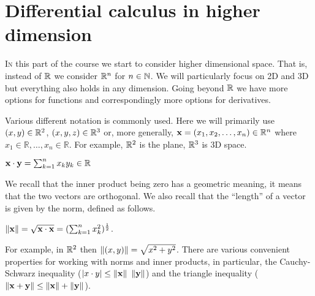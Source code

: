 \chapter{Differential calculus in higher dimension}

\lettrine{I}{n} this part of the course we start to consider higher dimensional space.
That is, instead of \(\mathbb{R}\) we consider \(\mathbb{R}^n\) for \(n\in \mathbb{N}\).
We will particularly focus on 2D and 3D but everything also holds in any dimension.
Going beyond \(\mathbb{R}\) we have more options for functions and correspondingly more options for derivatives.

Various different notation is commonly used.
Here we will primarily use \((x,y)\in \mathbb{R}^2\), \((x,y,z)\in\mathbb{R}^3\) or, more generally,  \(\mathbf{x} =(x_1,x_2,\ldots,x_n) \in \mathbb{R}^n \)
where
\( x_1 \in \mathbb{R},\ldots, x_n \in \mathbb{R}\).
For example, \(\mathbb{R}^2\) is the plane, \(\mathbb{R}^3\) is 3D space.

\begin{definition}
    \(\mathbf{x} \cdot \mathbf{y} = \sum_{k=1}^{n} x_k y_k \in \mathbb{R}\)
\end{definition}

\noindent
We recall that the inner product being zero has a geometric meaning, it means that the two vectors are orthogonal.
We also recall that the ``length'' of a vector is given by the norm, defined as follows.

\begin{definition}[norm]
    \(\left\|\mathbf{x}\right\| =  \sqrt{\mathbf{x} \cdot \mathbf{x}} = (\sum_{k=1}^{n} x_k^2 )^{\frac{1}{2}}\).
\end{definition}

\noindent
For example, in \(\mathbb{R}^2\) then \(\left\|(x,y)\right\| = \sqrt{x^2 + y^2}\).
There are various convenient properties for working with norms and inner products, in particular, the Cauchy-Schwarz inequality (\(\abs{x\cdot y} \leq \norm{\xx} \ \norm{\yy}\)) and the triangle inequality (\(\left\|\mathbf{x} + \mathbf{y}\right\| \leq \left\|\mathbf{x}\right\| + \left\|\mathbf{y}\right\|\)).

